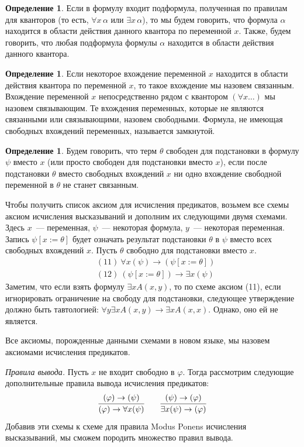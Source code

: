 \documentclass[a4paper,11pt]{article}
\theoremstyle{definition}
\newtheorem{dfn}[thm]{Определение}
\begin{document}
\begin{dfn}
Если в формулу входит подформула, полученная по правилам для кванторов (то есть,
$\forall x\,\alpha$ или $\exists x\,\alpha$), то мы будем говорить, что формула
$\alpha$ находится в области действия данного квантора по переменной $x$. Также,
будем говорить, что любая подформула формулы $\alpha$ находится в области
действия данного квантора.
\end{dfn}

\begin{dfn}
Если некоторое вхождение переменной $x$ находится в области действия квантора по
переменной $x$, то такое вхождение мы назовем связанным. Вхождение переменной
$x$ непосредственно рядом с квантором $(\forall x \dots)$ мы назовем
связывающим. Те вхождения переменных, которые не являются связанными или
связывающими, назовем свободными. Формула, не имеющая свободных вхождений
переменных, называется замкнутой.
\end{dfn}

\begin{dfn}
Будем говорить, что терм $\theta$ свободен для подстановки в формулу $\psi$
вместо $x$ (или просто свободен для подстановки вместо $x$), если после
подстановки $\theta$ вместо свободных вхождений $x$ ни одно вхождение свободной
переменной в $\theta$ не станет связанным.
\end{dfn}

Чтобы получить список аксиом для исчисления предикатов, возьмем все схемы аксиом
исчисления высказываний и дополним их следующими двумя схемами. Здесь $x$~---
переменная, $\psi$~--- некоторая формула, $y$~--- некоторая переменная. Запись
$\psi[x := \theta]$ будет означать результат подстановки $\theta$ в $\psi$ вместо
всех свободных вхождений $x$. Пусть $\theta$ свободно для подстановки вместо
$x$.
\begin{align*}
&(11)\ \forall x(\psi) \to (\psi[x := \theta])\\
&(12)\ (\psi[x := \theta]) \to \exists x(\psi)
\end{align*}
Заметим, что если взять формулу $\exists x A(x, y)$, то по схеме аксиом (11), если
игнорировать ограничение на свободу для подстановки, следующее утверждение
должно быть тавтологией: $\forall y\exists x A(x, y) \to \exists x A(x, x)$.
Однако, оно ей не является.

Все аксиомы, порожденные данными схемами в новом языке, мы назовем аксиомами
исчисления предикатов.

\emph{Правила вывода.} Пусть $x$ не входит свободно в $\varphi$. Тогда
рассмотрим следующие дополнительные правила вывода исчисления предикатов:
\[
\infer{(\varphi) \to \forall x(\psi)}{(\varphi) \to (\psi)}
\qquad
\infer{\exists x(\psi) \to (\varphi)}{(\psi) \to (\varphi)}
\]
Добавив эти схемы к схеме для правила Modus Ponens исчисления высказываний, мы
сможем породить множество правил вывода.
\end{document}

